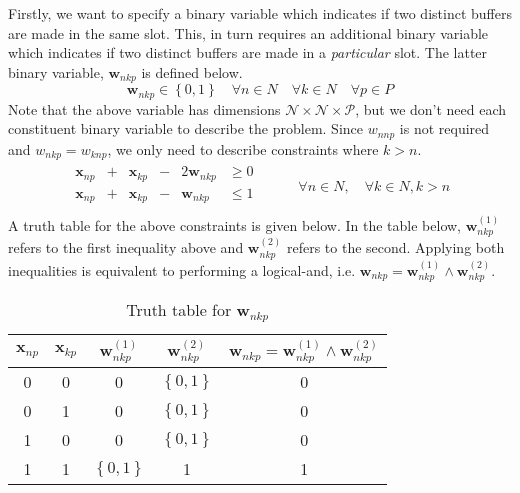 Firstly, we want to specify a binary variable which indicates if two distinct
buffers are made in the same slot.
This, in turn requires an additional binary variable which indicates if two
distinct buffers are made in a \emph{particular} slot.
The latter binary variable, $ \boldsymbol{w}_{nkp} $ is defined below.
\begin{equation}
    \boldsymbol{w}_{nkp} \in \left\{ 0, 1 \right\} \quad \forall n \in N \quad
    \forall k \in N \quad \forall p \in P
    \label{eq.w}
\end{equation}
Note that the above variable has dimensions 
$\mathcal{N} \times \mathcal{N} \times \mathcal{P}$, but we don't
need each constituent binary variable to describe the problem.
Since $w_{nnp}$ is not required and $w_{nkp} = w_{knp}$, we only need to
describe constraints where $k > n$.
\begin{equation}
    \begin{split}
        \begin{alignedat}{3}
            \boldsymbol{x}_{np} & {}+{} & \boldsymbol{x}_{kp} & {}-{} & 2
            \boldsymbol{w}_{nkp} & \ge 0\\
            \boldsymbol{x}_{np} & {}+{} & \boldsymbol{x}_{kp} & {}-{} &
            \boldsymbol{w}_{nkp} & \le 1\\
        \end{alignedat}
    \end{split}
    \quad\quad
    \begin{split}
        \forall n \in N, \quad \forall k \in N, k > n
    \end{split}
    \label{eq.constr6}
\end{equation}
A truth table for the above constraints is given below.
In the table below, $\boldsymbol{w}_{nkp}^{\left( 1 \right)}$ refers to the
first inequality above and $\boldsymbol{w}_{nkp}^{\left( 2 \right)}$ refers to
the second.  Applying both inequalities is equivalent to performing a
logical-and, i.e.
$\boldsymbol{w}_{nkp} = \boldsymbol{w}_{nkp}^{\left( 1 \right)} \land
\boldsymbol{w}_{nkp}^{\left( 2 \right)}$.
\begin{table}[h!]
    \centering
    \caption{Truth table for $\boldsymbol{w}_{nkp}$}
    \label{tbl.truthw}
    \begin{tabular}{c c | c c | c}
        $\boldsymbol{x}_{np}$ & $\boldsymbol{x}_{kp}$ &
        $\boldsymbol{w}_{nkp}^{\left( 1 \right)}$ &
        $\boldsymbol{w}_{nkp}^{\left( 2 \right)}$ &
        $\boldsymbol{w}_{nkp} = \boldsymbol{w}_{nkp}^{\left( 1 \right)}
            \land \boldsymbol{w}_{nkp}^{\left( 2 \right)}
        $\\ \hline
        0 & 0 & 0 & $\left\{ 0,1 \right\}$ & 0\\
        0 & 1 & 0 & $\left\{ 0,1 \right\}$ & 0\\
        1 & 0 & 0 & $\left\{ 0,1 \right\}$ & 0\\
        1 & 1 & $\left\{ 0,1 \right\}$ & 1 & 1\\
    \end{tabular}
\end{table}


